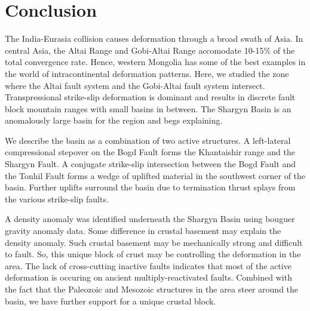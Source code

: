 \section{Conclusion}
	The India-Eurasia collision causes deformation through a broad swath of Asia. In central Asia, the Altai Range and Gobi-Altai Range accomodate 10-15\% of the total convergence rate. Hence, western Mongolia has some of the best examples in the world of intracontinental deformation patterns. Here, we studied the zone where the Altai fault system and the Gobi-Altai fault system intersect. Transpressional strike-slip deformation is dominant and results in discrete fault block mountain ranges with small basins in between. The Shargyn Basin is an anomalously large basin for the region and begs explaining. 

	We describe the basin as a combination of two active structures. A left-lateral compressional stepover on the Bogd Fault forms the Khantaishir range and the Shargyn Fault. A conjugate strike-slip intersection between the Bogd Fault and the Tonhil Fault forms a wedge of uplifted material in the southwest corner of the basin. Further uplifts surround the basin due to termination thrust splays from the various strike-slip faults. 

	A density anomaly was identified underneath the Shargyn Basin using bouguer gravity anomaly data. Some difference in crustal basement may explain the density anomaly. Such crustal basement may be mechanically strong and difficult to fault. So, this unique block of crust may be controlling the deformation in the area. The lack of cross-cutting inactive faults indicates that most of the active deformation is occuring on ancient multiply-reactivated faults. Combined with the fact that the Paleozoic and Mesozoic structures in the area steer around the basin, we have further support for a unique crustal block.


